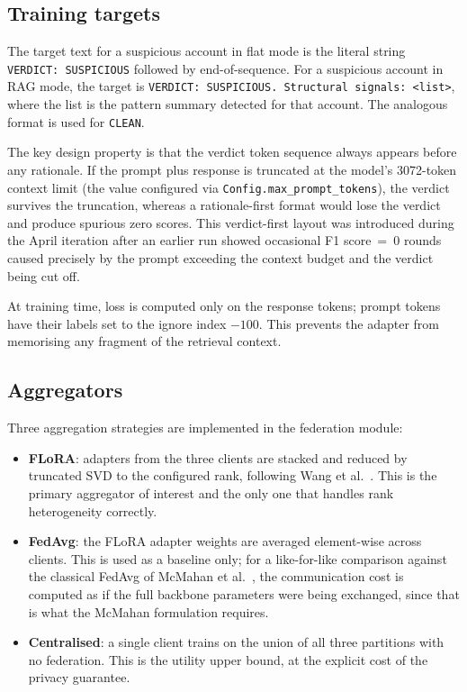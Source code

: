 \documentclass{report}
\begin{document}
\subsection{Training targets}
\label{sec:meth:impl:targets}

The target text for a suspicious account in flat mode is the literal string \texttt{VERDICT: SUSPICIOUS} followed by end-of-sequence. For a suspicious account in RAG mode, the target is \texttt{VERDICT: SUSPICIOUS. Structural signals: <list>}, where the list is the pattern summary detected for that account. The analogous format is used for \texttt{CLEAN}.

The key design property is that the verdict token sequence always appears before any rationale. If the prompt plus response is truncated at the model's 3072-token context limit (the value configured via \texttt{Config.max\_prompt\_tokens}), the verdict survives the truncation, whereas a rationale-first format would lose the verdict and produce spurious zero scores. This verdict-first layout was introduced during the April iteration after an earlier run showed occasional F1 score~=~0 rounds caused precisely by the prompt exceeding the context budget and the verdict being cut off.

At training time, loss is computed only on the response tokens; prompt tokens have their labels set to the ignore index $-100$. This prevents the adapter from memorising any fragment of the retrieval context.

\subsection{Aggregators}

Three aggregation strategies are implemented in the federation module:

\begin{itemize}
    \setlength\itemsep{0em}
    \item \textbf{FLoRA}: adapters from the three clients are stacked and reduced by truncated SVD to the configured rank, following Wang et al.~\cite{flora2024federated}. This is the primary aggregator of interest and the only one that handles rank heterogeneity correctly.
    \item \textbf{FedAvg}: the FLoRA adapter weights are averaged element-wise across clients. This is used as a baseline only; for a like-for-like comparison against the classical FedAvg of McMahan et al.~\cite{mcmahan2017communication}, the communication cost is computed as if the full backbone parameters were being exchanged, since that is what the McMahan formulation requires.
    \item \textbf{Centralised}: a single client trains on the union of all three partitions with no federation. This is the utility upper bound, at the explicit cost of the privacy guarantee.
\end{itemize}
\end{document}
